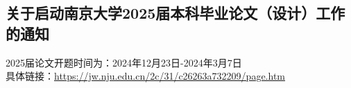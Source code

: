 \documentclass[letterpaper, 12pt]{article}
\begin{document}
\begin{multicols}{2}
\section{关于启动南京大学2025届本科毕业论文（设计）工作的通知}
2025届论文开题时间为：2024年12月23日-2024年3月7日\\
具体链接：\url{https://jw.nju.edu.cn/2c/31/c26263a732209/page.htm}\\

\end{multicols} 
\end{document}
